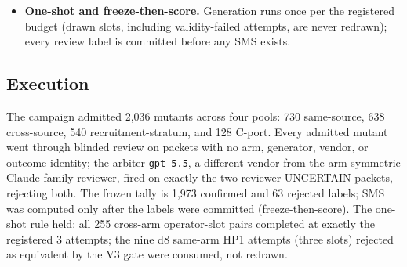 \documentclass[manuscript,screen,review]{acmart}
\begin{document}
\begin{itemize}
  non-Anthropic generation and the arbiter stayed on the gateway. The change
  is arm-symmetric (one reviewer sees both arms' blinded packets), so it
  cannot bias \(\Delta\delta\); the registered extra rich-class slots
  relocated into a dedicated harness recruitment stratum over the 15 rich
  PUTs (registered floor \(m_s = 11\), executed as 36 slots per PUT) with
  pooling pre-declared. Neither amendment moves a threshold, estimand,
  decision rule, or seed, and both precede any outcome, so neither can be
  selection on the response.
\item
  \textbf{One-shot and freeze-then-score.} Generation runs once per the
  registered budget (drawn slots, including validity-failed attempts, are
  never redrawn); every review label is committed before any SMS exists.
\end{itemize}

\subsection{Execution}\label{study4-execution}

The campaign admitted 2{,}036 mutants across four pools: 730 same-source, 638
cross-source, 540 recruitment-stratum, and 128 C-port. Every admitted mutant
went through blinded review on packets with no arm, generator, vendor, or
outcome identity; the arbiter \texttt{gpt-5.5}, a different vendor from the
arm-symmetric Claude-family reviewer, fired on exactly the two
reviewer-UNCERTAIN packets, rejecting both. The frozen tally is 1{,}973
confirmed and 63 rejected labels; SMS was computed only after the labels were
committed (freeze-then-score). The one-shot rule held: all 255 cross-arm
operator-slot pairs completed at exactly the registered 3 attempts; the nine
d8 same-arm HP1 attempts (three slots) rejected as equivalent by the V3 gate
were consumed, not redrawn.
\end{document}
